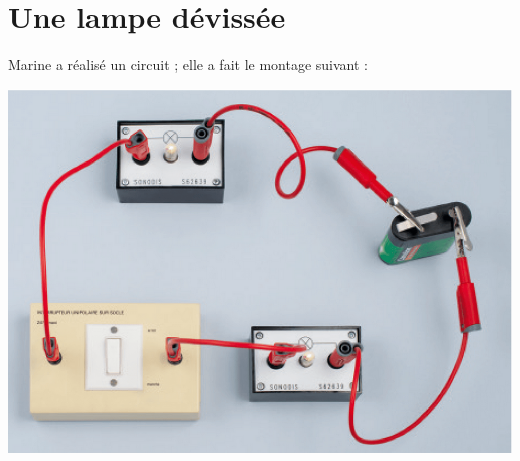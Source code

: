 \section{Une lampe dévissée}

Marine a réalisé un circuit ; elle a fait le montage suivant :

\begin{center}
	\includegraphics[scale=0.3]{img/circuit_A}
\end{center}

